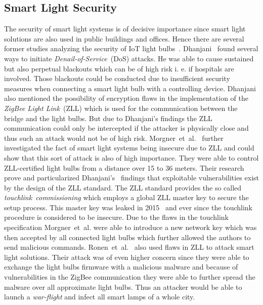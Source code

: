 \documentclass[11pt,a4paper]{article}
\begin{document}
	\subsection{Smart Light Security}%
	\label{sub:smart_light_security}
	The security of smart light systems is of decisive importance since smart light solutions are also used in public buildings and offices. Hence there are several former studies analyzing the security of IoT light bulbs~\cite{Dhanjani:2013:HLSEPHPWLS, Morgner:2016:AYBBUICSSCLS, Ronen:2018:IGNCZCR}. 
	Dhanjani~\cite{Dhanjani:2013:HLSEPHPWLS} found several ways to initiate \textit{Denail-of-Service}~(DoS) attacks. He was able to cause sustained but also perpetual blackouts which can be of high risk i. e. if hospitals are involved. Those blackouts could be conducted due to insufficient security measures when connecting a smart light bulb with a controlling device. Dhanjani also mentioned the possibility of encryption flaws in the implementation of the \textit{ZigBee Light Link}~(ZLL) which is used for the communication between the bridge and the light bulbs. But due to Dhanjani's findings the ZLL communication could only be intercepted if the attacker is physically close and thus such an attack would not be of high risk.
	Morgner~et~al.~\cite{Morgner:2016:AYBBUICSSCLS} further investigated the fact of smart light systems being insecure due to ZLL and could show that this sort of attack is also of high importance. They were able to control ZLL-certified light bulbs from a distance over 15 to 36 meters. Their research prove and particularized Dhanjani's~\cite{Dhanjani:2013:HLSEPHPWLS} findings that exploitable vulnerabilities exist by the design of the ZLL standard. The ZLL standard provides the so called \textit{touchlink~commissioning} which employs a global ZLL master key to secure the setup process. This master key was leaked in 2015~\cite{Morgner:2016:AYBBUICSSCLS} and ever since the touchlink procedure is considered to be insecure. Due to the flaws in the touchlink specification Morgner~et~al. were able to introduce a new network key which was then accepted by all connected light bulbs which further allowed the authors to send malicious commands. 
	Ronen~et~al.~\cite{Ronen:2018:IGNCZCR} also used flaws in ZLL to attack smart light solutions. Their attack was of even higher concern since they were able to exchange the light bulbs firmware with a malicious malware and because of vulnerabilities in the ZigBee communication they were able to further spread the malware over all approximate light bulbs. Thus an attacker would be able to launch a \textit{war-flight} and infect all smart lamps of a whole city.
\end{document}
